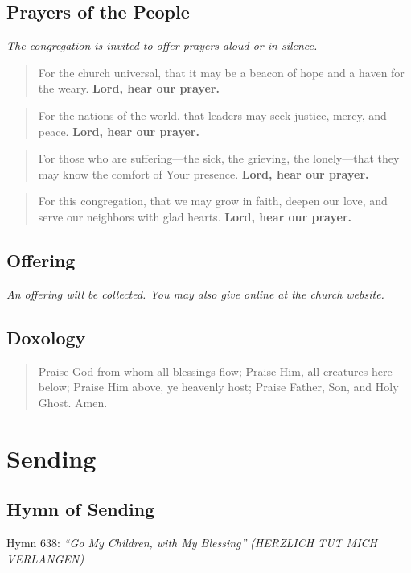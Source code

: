 \documentclass[
    language=english,
    doctype=liturgy,
    institution=none,
]{../../omnilatex}
\begin{document}
\subsection{Prayers of the People}
\textit{The congregation is invited to offer prayers aloud or in silence.}

\begin{quote}
For the church universal, that it may be a beacon of hope and a haven for the weary. \textbf{Lord, hear our prayer.}
\end{quote}

\begin{quote}
For the nations of the world, that leaders may seek justice, mercy, and peace. \textbf{Lord, hear our prayer.}
\end{quote}

\begin{quote}
For those who are suffering---the sick, the grieving, the lonely---that they may know the comfort of Your presence. \textbf{Lord, hear our prayer.}
\end{quote}

\begin{quote}
For this congregation, that we may grow in faith, deepen our love, and serve our neighbors with glad hearts. \textbf{Lord, hear our prayer.}
\end{quote}

\subsection{Offering}
\textit{An offering will be collected. You may also give online at the church website.}

\subsection{Doxology}
\begin{quote}
Praise God from whom all blessings flow;
Praise Him, all creatures here below;
Praise Him above, ye heavenly host;
Praise Father, Son, and Holy Ghost. Amen.
\end{quote}

\section{Sending}

\subsection{Hymn of Sending}
Hymn 638: \textit{``Go My Children, with My Blessing''}
\textit{(HERZLICH TUT MICH VERLANGEN)}
\end{document}
